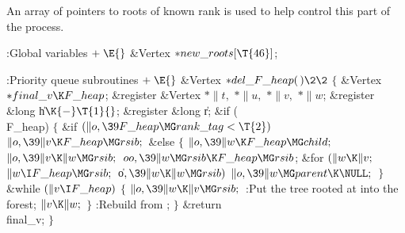 An array of pointers to roots of known rank is used to help control
this part of the process.

\Y\B\4:Global variables\X${}\mathrel+\E{}$\6
\&{Vertex} ${}{*}\\{new\_roots}[\T{46}]{}$;\par
\fi

\B{}:Priority queue subroutines\X${}\mathrel+\E{}$\6
\1\1\&{Vertex} ${}{*}\\{del\_F\_heap}(\,)\2\2{}$\6
${}\{{}$\5
\1\&{Vertex} ${}{*}\\{final\_v}\K\\{F\_heap}{}$;\6
\&{register} \&{Vertex} ${}{*}\|t,{}$ ${}{*}\|u,{}$ ${}{*}\|v,{}$ ${}{*}\|w{}$;%
\6
\&{register} \&{long} \|h${}\K{-}\T{1}{}$;\6
\&{register} \&{long} \|r;\7
\&{if} (\\{F\_heap})\5
${}\{{}$\1\6
\&{if} ${}(\|o,\39\\{F\_heap}\MG\\{rank\_tag}<\T{2}){}$\1\5
${}\|o,\39\|v\K\\{F\_heap}\MG\\{rsib};{}$\2\6
\&{else}\5
${}\{{}$\1\6
${}\|o,\39\|w\K\\{F\_heap}\MG\\{child};{}$\6
${}\|o,\39\|v\K\|w\MG\\{rsib};{}$\6
${}\\{oo},\39\|w\MG\\{rsib}\K\\{F\_heap}\MG\\{rsib}{}$;\6
\&{for} ${}(\|w\K\|v;{}$ ${}\|w\I\\{F\_heap}\MG\\{rsib};{}$ \|o${},\39\|w\K\|w%
\MG\\{rsib}){}$\1\5
${}\|o,\39\|w\MG\\{parent}\K\NULL;{}$\2\6
\4${}\}{}$\2\6
\&{while} ${}(\|v\I\\{F\_heap}){}$\5
${}\{{}$\1\6
${}\|o,\39\|w\K\|v\MG\\{rsib};{}$\6
:Put the tree rooted at  into the  forest\X;\6
${}\|v\K\|w;{}$\6
\4${}\}{}$\2\6
:Rebuild  from \X;\6
\4${}\}{}$\2\6
\&{return} \\{final\_v};\6
\4${}\}{}$\2\par
\fi

